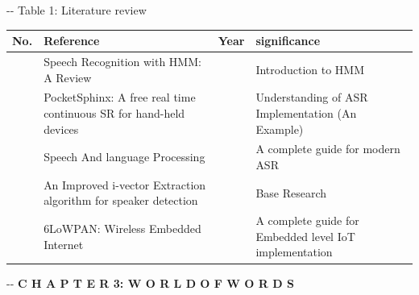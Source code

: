 \documentclass[12pt]{article}
\makeatletter
\newenvironment{indentation}[3]%
	{\par\setlength{\parindent}{#3}
	\setlength{\leftmargin}{#1}       \setlength{\rightmargin}{#2}%
	\advance\linewidth -\leftmargin       \advance\linewidth -\rightmargin%
	\advance\@totalleftmargin\leftmargin  \@setpar{{\@@par}}%
	\parshape 1\@totalleftmargin \linewidth\ignorespaces}{\par}%
\makeatother
\begin{document}
\begin{center}
\begin{indentation}{0pt}{0pt}{0pt}
Table 1: Literature review
\end{indentation}
\end{center}
{\raggedright

\vspace{3pt} \noindent
\begin{tabular}{|p{20pt}|p{174pt}|p{35pt}|p{131pt}|}
\hline

\parbox{20pt}{\centering 
\textbf{{\large No.}}
} & \parbox{174pt}{\centering 
\textbf{{\large Reference}}
} & \parbox{35pt}{\centering 
\textbf{{\large Year}}
} & \parbox{131pt}{\centering 
\textbf{{\large significance}}
} \\
\hline
\parbox{17pt}{
} & \parbox{174pt}{\raggedright 
Speech Recognition with HMM: A Review
} & \parbox{35pt}{
} & \parbox{131pt}{\raggedright 
Introduction to HMM
} \\
\hline
\parbox{17pt}{
} & \parbox{174pt}{\raggedright 
PocketSphinx: A free real time continuous SR for hand-held devices
} & \parbox{35pt}{
} & \parbox{131pt}{\raggedright 
Understanding of ASR Implementation (An Example)
} \\
\hline
\parbox{17pt}{
} & \parbox{174pt}{\raggedright 
Speech And language Processing
} & \parbox{35pt}{
} & \parbox{131pt}{\raggedright 
A complete guide for modern ASR
} \\
\hline
\parbox{17pt}{
} & \parbox{174pt}{\raggedright 
An Improved i-vector Extraction algorithm for speaker detection
} & \parbox{35pt}{
} & \parbox{131pt}{\raggedright 
Base Research
} \\
\hline
\parbox{17pt}{
} & \parbox{174pt}{\raggedright 
6LoWPAN: Wireless Embedded Internet
} & \parbox{35pt}{
} & \parbox{131pt}{\raggedright 
A complete guide for Embedded level IoT implementation
} \\
\hline
\end{tabular}
\vspace{2pt}

}
\pagebreak

\hspace{15pt}\hspace{15pt}
\begin{center}
\begin{indentation}{0pt}{0pt}{0pt}
\textbf{{\Large C H A P T E R 3: W O R L D   O F   W O R D S}}
\end{indentation}
\end{center}
\end{document}
